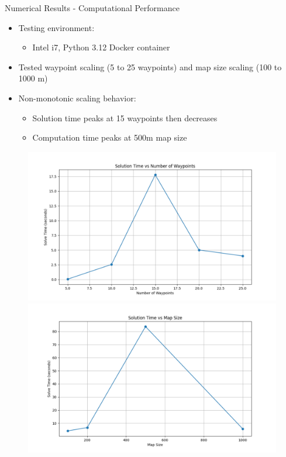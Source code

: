 \documentclass[aspectratio=169,11pt,xcolor={dvipsnames},hyperref={pdftex,pdfpagemode=UseNone,hidelinks,pdfdisplaydoctitle=true},usepdftitle=false]{beamer}
\begin{document}
      \begin{frame}{Numerical Results - Computational Performance}
        \begin{itemize}
          \item Testing environment: 
            \begin{itemize}
            \item Intel i7, Python 3.12 Docker container
          \end{itemize}
        \item Tested waypoint scaling (5 to 25 waypoints) and map size scaling (100 to 1000 m)
        \item Non-monotonic scaling behavior:
          \begin{itemize}
            \item Solution time peaks at 15 waypoints then decreases
            \item Computation time peaks at 500m map size
          \end{itemize}
      \end{itemize}
      
      \begin{figure}
        \centering
        \includegraphics[width=0.48\linewidth]{figures/waypoints_vs_time.pdf}
        \includegraphics[width=0.48\linewidth]{figures/map_size_vs_time.pdf}
      \end{figure}
    \end{frame}
\end{document}
